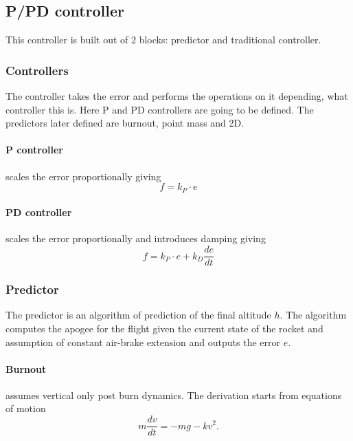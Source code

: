 \subsection{P/PD controller}
This controller is built out of 2 blocks: predictor and traditional controller.

\subsubsection{Controllers}
The controller takes the error and performs the operations on it depending, what controller this is.
Here P and PD controllers are going to be defined. The predictors later defined are burnout, point 
mass and 2D.

\paragraph{P controller} scales the error proportionally giving
\begin{equation}
    f = k_P\cdot e
\end{equation} 

\paragraph{PD controller} scales the error proportionally and introduces damping giving
\begin{equation}
    f = k_P\cdot e + k_D \frac{de}{dt}
\end{equation} 


\subsubsection{Predictor}
The predictor is an algorithm of prediction of the final altitude $h$. The algorithm computes the apogee
for the flight given the current state of the rocket and assumption of constant air-brake extension and 
outputs the error $e$.

\paragraph{Burnout} assumes vertical only post burn dynamics. The derivation starts from equations of motion
\begin{equation}
    m \frac{dv}{dt} = -mg - kv^2.
\end{equation}

